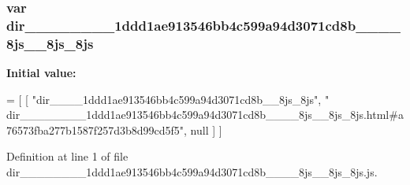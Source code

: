 \subsubsection[{dir\+\_\+\+\_\+\+\_\+\+\_\+\+\_\+\+\_\+\+\_\+\+\_\+1ddd1ae913546bb4c599a94d3071cd8b\+\_\+\+\_\+\+\_\+\+\_\+8js\+\_\+\+\_\+8js\+\_\+8js}]{\setlength{\rightskip}{0pt plus 5cm}var dir\+\_\+\+\_\+\+\_\+\+\_\+\+\_\+\+\_\+\+\_\+\+\_\+1ddd1ae913546bb4c599a94d3071cd8b\+\_\+\+\_\+\+\_\+\+\_\+8js\+\_\+\+\_\+8js\+\_\+8js}\label{dir________________1ddd1ae913546bb4c599a94d3071cd8b________8js____8js__8js_8js_ab5aa731fc09c736db1975928f0a8b630}
{\bfseries Initial value\+:}
\begin{DoxyCode}
=
[
    [ \textcolor{stringliteral}{"dir\_\_\_\_1ddd1ae913546bb4c599a94d3071cd8b\_\_8js\_8js"}, \textcolor{stringliteral}{"
      dir\_\_\_\_\_\_\_\_1ddd1ae913546bb4c599a94d3071cd8b\_\_\_\_8js\_\_8js\_8js.html#a76573fba277b1587f257d3b8d99cd5f5"}, null ]
]
\end{DoxyCode}


Definition at line 1 of file dir\+\_\+\+\_\+\+\_\+\+\_\+\+\_\+\+\_\+\+\_\+\+\_\+1ddd1ae913546bb4c599a94d3071cd8b\+\_\+\+\_\+\+\_\+\+\_\+8js\+\_\+\+\_\+8js\+\_\+8js.\+js.

